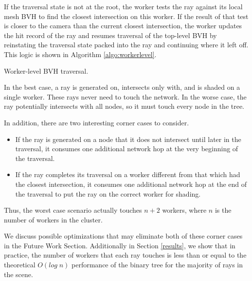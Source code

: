 \documentclass[a4paper,twoside]{article}
\begin{document}
If the traversal state is not at the root, the worker tests the ray against its local
mesh BVH to find the closest intersection on this worker. If the result of that
test is closer to the camera than the current closest intersection, the worker updates
the hit record of the ray and resumes traversal of the top-level BVH by
reinstating the traversal state packed into the ray and continuing where it left
off. This logic is shown in Algorithm \ref{algo:workerlevel}.

\begin{algorithm}
    \SetAlgoLined


    \caption{Worker-level BVH traversal.}
    \label{algo:workerlevel}
\end{algorithm}

In the best case, a ray is generated on, intersects only with, and is shaded on
a single worker. These rays never need to touch the network. In the worse case,
the ray potentially intersects with all nodes, so it must touch every node in
the tree.

In addition, there are two interesting corner cases to consider.

\begin{itemize}
    \item If the ray is generated on a node that it does not intersect until
        later in the traversal, it consumes one additional network hop at the
        very beginning of the traversal.
    \item If the ray completes its traversal on a worker different from that
        which had the closest intersection, it consumes one additional network
        hop at the end of the traversal to put the ray on the correct worker for
        shading.
\end{itemize}

Thus, the worst case scenario actually touches $n + 2$ workers, where $n$ is the
number of workers in the cluster.

We discuss possible optimizations that may eliminate both of these corner cases
in the Future Work Section. Additionally in Section \ref{results}, we show that
in practice, the number of workers that each ray touches is less than or equal
to the theoretical $O(log\;n)$ performance of the binary tree for the majority
of rays in the scene.
\end{document}
